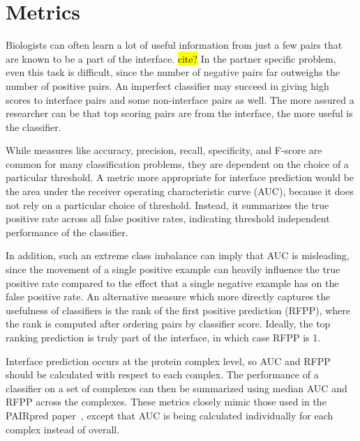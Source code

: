 \section{Metrics}

Biologists can often learn a lot of useful information from just a few pairs that are known to be a part of the interface. \hl{cite?}
In the partner specific problem, even this task is difficult, since the number of negative pairs far outweighs the number of positive pairs.
An imperfect classifier may succeed in giving high scores to interface pairs and some non-interface pairs as well.
The more assured a researcher can be that top scoring pairs are from the interface, the more useful is the classifier.

While measures like accuracy, precision, recall, specificity, and F-score are common for many classification problems, they are dependent on the choice of a particular threshold.
A metric more appropriate for interface prediction would be the area under the receiver operating characteristic curve (AUC), because it does not rely on a particular choice of threshold.
Instead, it summarizes the true positive rate across all false positive rates, indicating threshold independent performance of the classifier.

In addition, such an extreme class imbalance can imply that AUC is misleading, since the movement of a single positive example can heavily influence the true positive rate compared to the effect that a single negative example has on the false positive rate.
An alternative measure which more directly captures the usefulness of classifiers is the rank of the first positive prediction (RFPP), where the rank is computed after ordering pairs by classifier score.
Ideally, the top ranking prediction is truly part of the interface, in which case RFPP is 1.

Interface prediction occurs at the protein complex level, so AUC and RFPP should be calculated with respect to each complex. 
The performance of a classifier on a set of complexes can then be summarized using median AUC and RFPP across the complexes.
These metrics closely mimic those used in the PAIRpred paper~\cite{minhas2014}, except that AUC is being calculated individually for each complex instead of overall.
